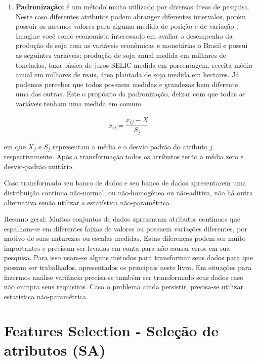 \documentclass[
]{book}
\providecommand{\tightlist}{%
  \setlength{\itemsep}{0pt}\setlength{\parskip}{0pt}}
\begin{document}
\begin{enumerate}
\def\labelenumi{\arabic{enumi}.}
\setcounter{enumi}{4}
\tightlist
\item
  \textbf{Padronização:} é um método muito utilizado por diversas áreas de pesquisa. Neste caso diferentes atributos podem abranger diferentes intervalos, porém possuir os mesmos valores para alguma medida de posição e de variação \citep{carvalho2011inteligencia}. Imagine você como economista interessado em avaliar o desempenho da produção de soja com as variáveis econômicas e monetárias o Brasil e possui as seguintes variáveis: produção de soja anual medida em milhares de toneladas, taxa básica de juros SELIC medida em porcentagem, receita média anual em milhares de reais, área plantada de soja medida em hectares. Já podemos perceber que todos possuem medidas e grandezas bem diferente uma das outras. Este o propósito da padronização, deixar com que todas as variáveis tenham uma medida em comum.
\end{enumerate}

\begin{equation}
x_{ij}=\frac{x_{ij}-\overline{X}}{S_j}
\label{eq:padronizacao}
\end{equation}

em que \(\overline{X_j}\) e \(S_j\) representam a média e o desvio padrão do atributo \(j\) respectivamente. Após a transformação todos os atributos terão a média zero e desvio-padrão unitário.

Caso transformado seu banco de dados e seu banco de dados apresentarem uma distribuição contínua não-normal, ou não-homogênea ou não-aditiva, não há outra alternativa senão utilizar a estatística não-paramétrica.

Resumo geral: Muitos conjuntos de dados apresentam atributos contínuos que espalham-se em diferentes faixas de valores ou possuem variações diferentes, por motivo de suas naturezas ou escalas medidas. Estas diferenças podem ser muito importantes e precisam ser levadas em conta para não causar erros em sua pesquisa. Para isso usam-se alguns métodos para transformar seus dados para que possam ser trabalhados, apresentados os principais neste livro. Em situações para fazermos análise variância precisa-se também ser transformado seus dados caso não cumpra seus requisitos. Caso o problema ainda persistir, precisa-se utilizar estatística não-paramétrica.

\hypertarget{features-selection---seleuxe7uxe3o-de-atributos-sa}{%
\section{Features Selection - Seleção de atributos (SA)}\label{features-selection---seleuxe7uxe3o-de-atributos-sa}}
\end{document}
